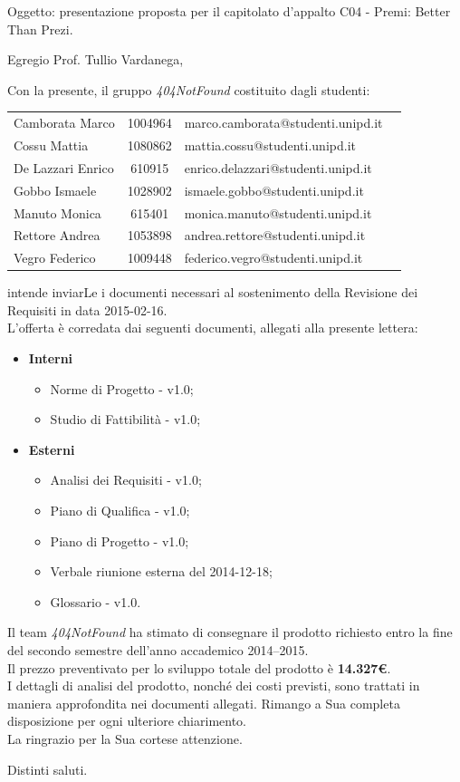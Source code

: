 \documentclass[a4paper,10pt]{letter}
\newcommand{\gruppo}{404NotFound}
\newcommand{\premi}{Premi: Better Than Prezi}
\newcommand{\Vardanega}{Prof. Tullio Vardanega}
\newcommand{\VeFe}{Vegro Federico}
\newcommand{\CaMa}{Camborata Marco}
\newcommand{\GoIs}{Gobbo Ismaele}
\newcommand{\DeEn}{De Lazzari Enrico}
\newcommand{\CoMa}{Cossu Mattia}
\newcommand{\ReAn}{Rettore Andrea}
\newcommand{\MaMo}{Manuto Monica}
\begin{document}
	
	\begin{letter}{Oggetto: presentazione proposta per il capitolato d'appalto  C04 - \premi.}
	\opening {Egregio \Vardanega ,}
	Con la presente, il gruppo \textit{\gruppo} costituito dagli studenti: 
		\begin{center}
		\begin{tabular}{l c l c}					
		\CaMa & 1004964 & marco.camborata@studenti.unipd.it \\
		\CoMa & 1080862 & mattia.cossu@studenti.unipd.it\\
		\DeEn & 610915  & enrico.delazzari@studenti.unipd.it\\ 
		\GoIs & 1028902 & ismaele.gobbo@studenti.unipd.it\\
		\MaMo & 615401  & monica.manuto@studenti.unipd.it\\
		\ReAn & 1053898 & andrea.rettore@studenti.unipd.it\\
		\VeFe & 1009448 & federico.vegro@studenti.unipd.it\\
		\end{tabular}
		\end{center}
	intende inviarLe i documenti necessari al sostenimento della Revisione dei Requisiti in data 2015-02-16.\\
    L'offerta è corredata dai seguenti documenti, allegati alla presente lettera:
			\begin{itemize}
				\item \textbf{Interni}
					\begin{itemize}
						\item Norme di Progetto - v1.0;
						\item Studio di Fattibilità - v1.0;
					\end{itemize}
				\item \textbf{Esterni}
					\begin{itemize}
						\item Analisi dei Requisiti - v1.0;
						\item Piano di Qualifica - v1.0;
						\item Piano di Progetto - v1.0;						
						\item Verbale riunione esterna del 2014-12-18;						
						\item Glossario - v1.0.
					\end{itemize}
			\end{itemize} 
		Il team \textit{\gruppo} ha stimato di consegnare il prodotto richiesto entro la fine del secondo semestre dell'anno accademico 2014–2015.\\
		Il prezzo preventivato per lo sviluppo totale del prodotto è \textbf{14.327\euro}. \\ 
		I dettagli di analisi del prodotto, nonché dei costi previsti, sono trattati in maniera approfondita nei documenti allegati. Rimango a Sua completa disposizione per ogni ulteriore chiarimento.\\ La ringrazio per la Sua cortese attenzione.
\thispagestyle{fancy}
\closing{Distinti saluti.}
   \end{letter}
\end{document}
